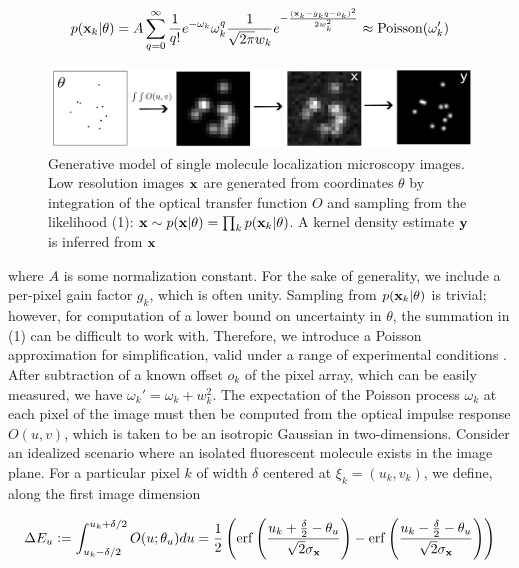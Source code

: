 \documentclass{article}
\begin{document}
\begin{equation}
p(\bold{x}_{k}|\theta) = A\sum_{q=0}^{\infty} \frac{1}{q!}e^{-\omega_{k}}\omega_{k}^{q}\frac{1}{\sqrt{2\pi}w_{k}}e^{-\frac{(\bold{x}_{k}-g_{k}q-o_{k})^2}{2 w_{k}^{2}}} \approx \mathrm{Poisson}(\omega_{k}')
\end{equation}


\begin{figure}
\includegraphics[scale=0.225]{media/Generation.png}
\caption{Generative model of single molecule localization microscopy images. Low resolution images $\bold{x}$ are generated from coordinates $\theta$ by integration of the optical transfer function $O$ and sampling from the likelihood (1): $\bold{x}\sim p(\bold{x}|\theta) = \prod_{k} p(\bold{x}_k|\theta)$. A kernel density estimate $\bold{y}$ is inferred from $\bold{x}$}
\end{figure}

where $A$ is some normalization constant. For the sake of generality, we include a per-pixel gain factor $g_{k}$, which is often unity. Sampling from $p(\bold{x}_{k}|\theta)$ is trivial; however, for computation of a lower bound on uncertainty in $\theta$, the summation in (1) can be difficult to work with. Therefore, we introduce a Poisson approximation for simplification, valid under a range of experimental conditions \citep{Huang2013}. After subtraction of a known offset $o_{k}$ of the pixel array, which can be easily measured, we have $\omega_{k}' = \omega_{k} + w_{k}^{2}$. The expectation of the Poisson process $\omega_{k}$ at each pixel of the image must then be computed from the optical impulse response $O(u,v)$, which is taken to be an isotropic Gaussian in two-dimensions. Consider an idealized scenario where an isolated fluorescent molecule exists in the image plane. For a particular pixel $k$ of width $\delta$ centered at $\xi_{k}=(u_k,v_k)$, we define, along the first image dimension

\begin{equation}
\Delta E_{u} \vcentcolon = \int_{u_{k}-\delta /2}^{u_{k}+\delta /2} O(u;\theta_{u})du = \frac{1}{2}\left(\mathrm{erf}\left(\frac{u_{k}+\frac{\delta}{2}-\theta_{u}}{\sqrt{2}\sigma_{\bold{x}}}\right) -\mathrm{erf}\left(\frac{u_{k}-\frac{\delta}{2}-\theta_{u}}{\sqrt{2}\sigma_{\bold{x}}}\right)\right)
\end{equation}
\end{document}
